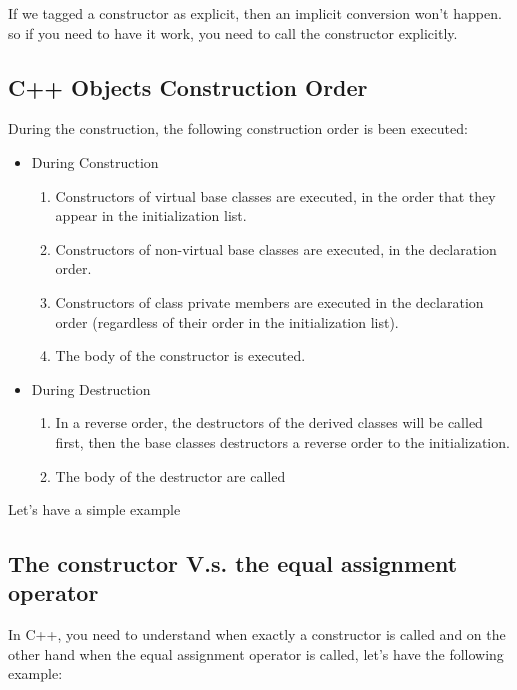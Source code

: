 \documentclass{article}
\begin{document}
If we tagged a constructor as explicit, then an implicit conversion won't happen. so if you need to have it work, you need to call the constructor explicitly.


\subsection{C++ Objects Construction Order}
During the construction, the following construction order is been executed:

\begin{itemize}
  \item During Construction
  \begin{enumerate}
    \item Constructors of virtual base classes are executed, in the order that they appear in the initialization list.
    \item Constructors of non-virtual base classes are executed, in the declaration order.
    \item Constructors of class private members are executed in the declaration order (regardless of their order in the initialization list).
    \item The body of the constructor is executed.
  \end{enumerate}

  \item During Destruction
  \begin{enumerate}
    \item In a reverse order, the destructors of the derived classes will be called first, then the base classes destructors a reverse order to the initialization.
    \item The body of the destructor are called 
  \end{enumerate}
\end{itemize}
Let's have a simple example


\subsection{The constructor V.s. the equal assignment operator}
In C++, you need to understand when exactly a constructor is called and on the other hand when the equal assignment operator is called, let's have the following example:
\end{document}
